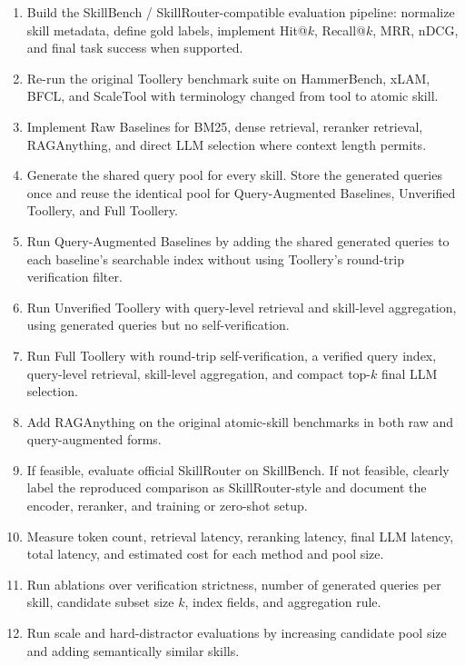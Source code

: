 \documentclass[11pt]{article}
\begin{document}
\begin{enumerate}
    \item Build the SkillBench / SkillRouter-compatible evaluation pipeline:
    normalize skill metadata, define gold labels, implement Hit@$k$,
    Recall@$k$, MRR, nDCG, and final task success when supported.
    \item Re-run the original Toollery benchmark suite on HammerBench, xLAM,
    BFCL, and ScaleTool with terminology changed from tool to atomic skill.
    \item Implement Raw Baselines for BM25, dense retrieval, reranker retrieval,
    RAGAnything, and direct LLM selection where context length permits.
    \item Generate the shared query pool for every skill. Store the generated
    queries once and reuse the identical pool for Query-Augmented Baselines,
    Unverified Toollery, and Full Toollery.
    \item Run Query-Augmented Baselines by adding the shared generated queries to
    each baseline's searchable index without using Toollery's round-trip
    verification filter.
    \item Run Unverified Toollery with query-level retrieval and skill-level
    aggregation, using generated queries but no self-verification.
    \item Run Full Toollery with round-trip self-verification, a verified query
    index, query-level retrieval, skill-level aggregation, and compact top-$k$
    final LLM selection.
    \item Add RAGAnything on the original atomic-skill benchmarks in both raw and
    query-augmented forms.
    \item If feasible, evaluate official SkillRouter on SkillBench. If not
    feasible, clearly label the reproduced comparison as SkillRouter-style and
    document the encoder, reranker, and training or zero-shot setup.
    \item Measure token count, retrieval latency, reranking latency, final LLM
    latency, total latency, and estimated cost for each method and pool size.
    \item Run ablations over verification strictness, number of generated
    queries per skill, candidate subset size $k$, index fields, and aggregation
    rule.
    \item Run scale and hard-distractor evaluations by increasing candidate pool
    size and adding semantically similar skills.
\end{enumerate}
\end{document}
